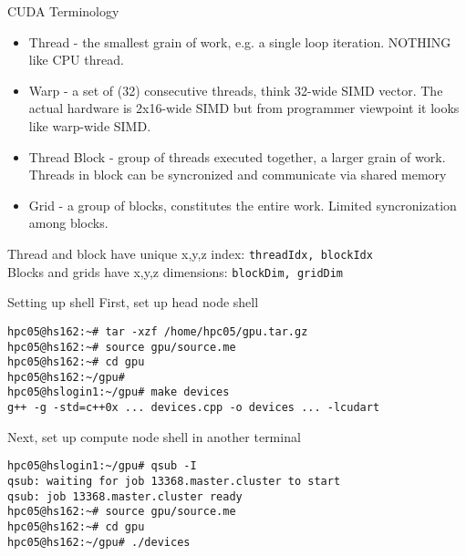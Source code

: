\documentclass{beamer}
\begin{document}
\begin{frame}[fragile]{CUDA Terminology}
  \begin{itemize}
    \item Thread - the smallest grain of work, e.g. a single loop iteration.
      NOTHING like CPU thread.
    \item Warp - a set of (32) consecutive threads, think 32-wide SIMD vector.
      The actual hardware is 2x16-wide SIMD but from programmer viewpoint it looks like 
      warp-wide SIMD.
    \item Thread Block - group of threads executed together, a larger grain of work.\\
      Threads in block can be syncronized and communicate via shared memory
    \item Grid - a group of blocks, constitutes the entire work.
      Limited syncronization among blocks.
  \end{itemize}
  Thread and block have unique x,y,z index: {\tt threadIdx, blockIdx } \\
  Blocks and grids have x,y,z dimensions: {\tt blockDim, gridDim } \\
\end{frame}

\begin{frame}[fragile]{Setting up shell}
  First, set up head node shell
  \begin{verbatim}
hpc05@hs162:~# tar -xzf /home/hpc05/gpu.tar.gz
hpc05@hs162:~# source gpu/source.me
hpc05@hs162:~# cd gpu
hpc05@hs162:~/gpu#
hpc05@hslogin1:~/gpu# make devices
g++ -g -std=c++0x ... devices.cpp -o devices ... -lcudart

\end{verbatim}
   Next, set up compute node shell in another terminal
  \begin{verbatim}
hpc05@hslogin1:~/gpu# qsub -I
qsub: waiting for job 13368.master.cluster to start
qsub: job 13368.master.cluster ready
hpc05@hs162:~# source gpu/source.me
hpc05@hs162:~# cd gpu
hpc05@hs162:~/gpu# ./devices
\end{verbatim}
\end{frame}
\end{document}
